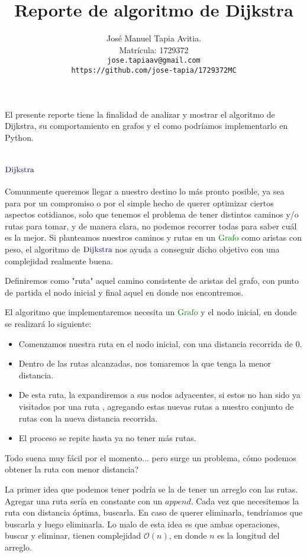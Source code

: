 \documentclass[12pt,a4paper]{article}
\author{
Jos\'e Manuel Tapia Avitia.\\
Matr\'icula: 1729372\\ 
\texttt{jose.tapiaav@gmail.com}\\
\texttt{https://github.com/jose-tapia/1729372MC}
}
\title{Reporte de algoritmo de Dijkstra}
\newcommand{\dijkstra}{$\textcolor{deepblue}{\mathrm{Dijkstra}}\>$}
\newcommand{\grafo}{$\textcolor{deepgreen}{\mathrm{Grafo}}\>$}
\begin{document}
\maketitle

El presente reporte tiene la finalidad de analizar y mostrar el algoritmo de Dijkstra, su comportamiento en grafos y el como podr\'iamos implementarlo en Python.

\section{$\textcolor{deepblue}{\mathrm{Dijkstra}}$}
Comunmente queremos llegar a nuestro destino lo m\'as pronto posible, ya sea para por un compromiso o por el simple hecho de querer optimizar ciertos aspectos cotidianos, solo que tenemos el problema de tener distintos caminos y/o rutas para tomar, y de manera clara, no podemos recorrer todas para saber cu\'al es la mejor. Si planteamos nuestros caminos y rutas en un \grafo como aristas con peso, el algoritmo de \dijkstra nos ayuda a conseguir dicho objetivo con una complejidad realmente buena.

Definiremos como "ruta" aquel camino consistente de aristas del grafo, con punto de partida el nodo inicial y final aquel en donde nos encontremos.

El algoritmo que implementaremos necesita un \grafo y el nodo inicial, en donde se realizar\'a lo siguiente:
\begin{itemize}
	\item Comenzamos nuestra ruta en el nodo inicial, con una distancia recorrida de 0.
	\item Dentro de las rutas alcanzadas, nos tomaremos la que tenga la menor distancia.
	\item De esta ruta, la expandiremos a sus nodos adyacentes, si estos no han sido ya visitados por una ruta , agregando estas nuevas rutas a nuestro conjunto de rutas con la nueva distancia recorrida.
	\item El proceso se repite hasta ya no tener m\'as rutas.
\end{itemize}

Todo suena muy f\'acil por el momento... pero surge un problema, \textquestiondown c\'omo podemos obtener la ruta con menor distancia?

La primer idea que podemos tener podr\'ia se la de tener un arreglo con las rutas. Agregar una ruta ser\'ia en constante con un $append$. Cada vez que necesitemos la ruta con distancia \'optima, buscarla. En caso de querer eliminarla, tendr\'iamos que buscarla y luego eliminarla. Lo malo de esta idea es que ambas operaciones, buscar y eliminar, tienen complejidad $\mathcal{O}(n)$, en donde $n$ es la longitud del arreglo. 
\end{document}
